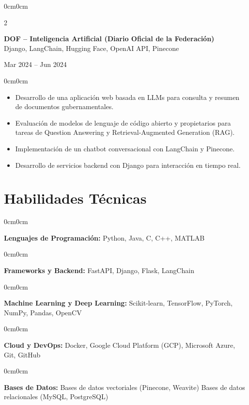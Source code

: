 \documentclass[10pt, letterpaper]{article}
\newenvironment{highlights}{
	\begin{itemize}[topsep=0.15cm,itemsep=0pt,leftmargin=10pt]
	}{
	\end{itemize}
}
\newenvironment{onecolentry}{
	\begin{adjustwidth}{0cm}{0cm}
	}{
	\end{adjustwidth}
	\vspace{0.02cm}
}
\newenvironment{twocolentry}[1]{
	\onecolentry
	\columnratio{0.75} 
	\begin{paracol}{2}
		\raggedright #1
		\switchcolumn
	}{
	\end{paracol}
	\endonecolentry
}
\begin{document}
	\vspace{0.2cm}
	
	\begin{twocolentry}
		{\textbf{DOF – Inteligencia Artificial (Diario Oficial de la Federación)}\\
		Django, LangChain, Hugging Face, OpenAI API, Pinecone}
		{Mar 2024 -- Jun 2024}
	\end{twocolentry}
	
	\begin{onecolentry}
		\begin{highlights}
			\item Desarrollo de una aplicación web basada en LLMs para consulta y resumen de documentos gubernamentales.
			\item Evaluación de modelos de lenguaje de código abierto y propietarios para tareas de Question Answering y Retrieval-Augmented Generation (RAG).
			\item Implementación de un chatbot conversacional con LangChain y Pinecone.
			\item Desarrollo de servicios backend con Django para interacción en tiempo real.
		\end{highlights}
	\end{onecolentry}

	
	\section{Habilidades Técnicas}
	
	\begin{onecolentry}
		\textbf{Lenguajes de Programación:} Python, Java, C, C++, MATLAB
	\end{onecolentry}
	
	\begin{onecolentry}
		\textbf{Frameworks y Backend:} FastAPI, Django, Flask, LangChain
	\end{onecolentry}
	
	\begin{onecolentry}
		\textbf{Machine Learning y Deep Learning:} Scikit-learn, TensorFlow, PyTorch, NumPy, Pandas, OpenCV
	\end{onecolentry}
	
	\begin{onecolentry}
		\textbf{Cloud y DevOps:} Docker, Google Cloud Platform (GCP), Microsoft Azure, Git, GitHub
	\end{onecolentry}
	
	\begin{onecolentry}
		\textbf{Bases de Datos:} Bases de datos vectoriales (Pinecone, Weavite) Bases de datos relacionales (MySQL, PostgreSQL)
	\end{onecolentry}
	
\end{document}
